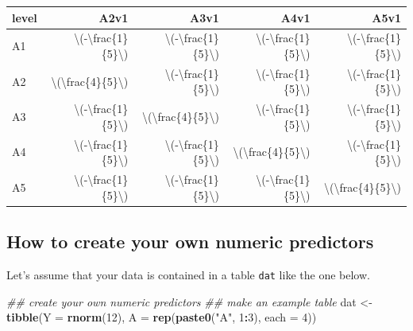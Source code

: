 \documentclass[]{book}
\newenvironment{Shaded}{\begin{snugshade}}{\end{snugshade}}
\newcommand{\CommentTok}[1]{\textcolor[rgb]{0.56,0.35,0.01}{\textit{#1}}}
\newcommand{\DataTypeTok}[1]{\textcolor[rgb]{0.13,0.29,0.53}{#1}}
\newcommand{\DecValTok}[1]{\textcolor[rgb]{0.00,0.00,0.81}{#1}}
\newcommand{\KeywordTok}[1]{\textcolor[rgb]{0.13,0.29,0.53}{\textbf{#1}}}
\newcommand{\NormalTok}[1]{#1}
\newcommand{\OperatorTok}[1]{\textcolor[rgb]{0.81,0.36,0.00}{\textbf{#1}}}
\newcommand{\StringTok}[1]{\textcolor[rgb]{0.31,0.60,0.02}{#1}}
\begin{document}
\begin{table}[H]
\centering
\begin{tabular}{l|r|r|r|r}
\hline
level & A2v1 & A3v1 & A4v1 & A5v1\\
\hline
A1 & \textbackslash{}(-\textbackslash{}frac\{1\}\{5\}\textbackslash{}) & \textbackslash{}(-\textbackslash{}frac\{1\}\{5\}\textbackslash{}) & \textbackslash{}(-\textbackslash{}frac\{1\}\{5\}\textbackslash{}) & \textbackslash{}(-\textbackslash{}frac\{1\}\{5\}\textbackslash{})\\
\hline
A2 & \textbackslash{}(\textbackslash{}frac\{4\}\{5\}\textbackslash{}) & \textbackslash{}(-\textbackslash{}frac\{1\}\{5\}\textbackslash{}) & \textbackslash{}(-\textbackslash{}frac\{1\}\{5\}\textbackslash{}) & \textbackslash{}(-\textbackslash{}frac\{1\}\{5\}\textbackslash{})\\
\hline
A3 & \textbackslash{}(-\textbackslash{}frac\{1\}\{5\}\textbackslash{}) & \textbackslash{}(\textbackslash{}frac\{4\}\{5\}\textbackslash{}) & \textbackslash{}(-\textbackslash{}frac\{1\}\{5\}\textbackslash{}) & \textbackslash{}(-\textbackslash{}frac\{1\}\{5\}\textbackslash{})\\
\hline
A4 & \textbackslash{}(-\textbackslash{}frac\{1\}\{5\}\textbackslash{}) & \textbackslash{}(-\textbackslash{}frac\{1\}\{5\}\textbackslash{}) & \textbackslash{}(\textbackslash{}frac\{4\}\{5\}\textbackslash{}) & \textbackslash{}(-\textbackslash{}frac\{1\}\{5\}\textbackslash{})\\
\hline
A5 & \textbackslash{}(-\textbackslash{}frac\{1\}\{5\}\textbackslash{}) & \textbackslash{}(-\textbackslash{}frac\{1\}\{5\}\textbackslash{}) & \textbackslash{}(-\textbackslash{}frac\{1\}\{5\}\textbackslash{}) & \textbackslash{}(\textbackslash{}frac\{4\}\{5\}\textbackslash{})\\
\hline
\end{tabular}
\end{table}

\hypertarget{how-to-create-your-own-numeric-predictors}{%
\subsection{How to create your own numeric predictors}\label{how-to-create-your-own-numeric-predictors}}

Let's assume that your data is contained in a table \texttt{dat} like the one below.

\begin{Shaded}
\begin{Highlighting}[]
 \CommentTok{## create your own numeric predictors}
 \CommentTok{## make an example table}
\NormalTok{ dat <-}\StringTok{ }\KeywordTok{tibble}\NormalTok{(}\DataTypeTok{Y =} \KeywordTok{rnorm}\NormalTok{(}\DecValTok{12}\NormalTok{),}
               \DataTypeTok{A =} \KeywordTok{rep}\NormalTok{(}\KeywordTok{paste0}\NormalTok{(}\StringTok{"A"}\NormalTok{, }\DecValTok{1}\OperatorTok{:}\DecValTok{3}\NormalTok{), }\DataTypeTok{each =} \DecValTok{4}\NormalTok{))}
\end{Highlighting}
\end{Shaded}
\end{document}
